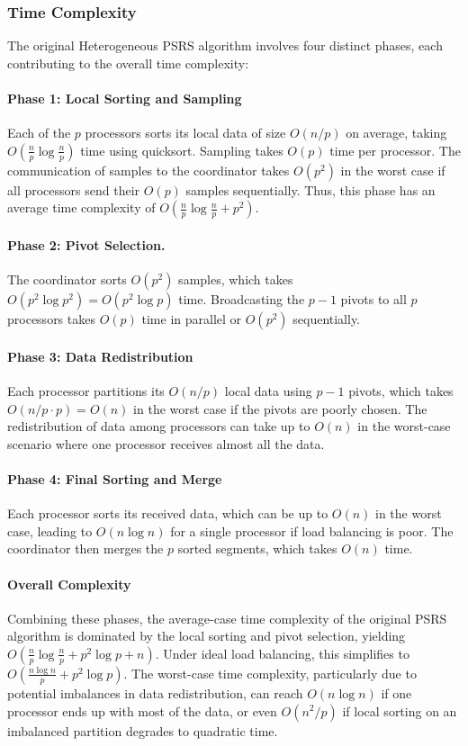 \documentclass[]{interact}
\theoremstyle{plain}
\theoremstyle{definition}
\theoremstyle{remark}
\begin{document}
\subsubsection{Time Complexity}
The original Heterogeneous PSRS algorithm involves four distinct phases, each contributing to the overall time complexity:

\paragraph{Phase 1: Local Sorting and Sampling} 
Each of the $p$ processors sorts its local data of size $O(n/p)$ on average, taking $O\left(\frac{n}{p} \log \frac{n}{p}\right)$ time using quicksort. Sampling takes $O(p)$ time per processor. The communication of samples to the coordinator takes $O(p^2)$ in the worst case if all processors send their $O(p)$ samples sequentially. Thus, this phase has an average time complexity of $O\left(\frac{n}{p} \log \frac{n}{p} + p^2\right)$.

\paragraph{Phase 2: Pivot Selection. }
The coordinator sorts $O(p^2)$ samples, which takes $O(p^2 \log p^2) = O(p^2 \log p)$ time. Broadcasting the $p - 1$ pivots to all $p$ processors takes $O(p)$ time in parallel or $O(p^2)$ sequentially.

\paragraph{Phase 3: Data Redistribution} Each processor partitions its $O(n/p)$ local data using $p - 1$ pivots, which takes $O(n/p \cdot p) = O(n)$ in the worst case if the pivots are poorly chosen. The redistribution of data among processors can take up to $O(n)$ in the worst-case scenario where one processor receives almost all the data.

\paragraph{Phase 4: Final Sorting and Merge} Each processor sorts its received data, which can be up to $O(n)$ in the worst case, leading to $O(n \log n)$ for a single processor if load balancing is poor. The coordinator then merges the $p$ sorted segments, which takes $O(n)$ time.

\paragraph{Overall Complexity} Combining these phases, the average-case time complexity of the original PSRS algorithm is dominated by the local sorting and pivot selection, yielding $O\left(\frac{n}{p} \log \frac{n}{p} + p^2 \log p + n\right)$. Under ideal load balancing, this simplifies to $O\left(\frac{n \log n}{p} + p^2 \log p\right)$. The worst-case time complexity, particularly due to potential imbalances in data redistribution, can reach $O(n \log n)$ if one processor ends up with most of the data, or even $O(n^2/p)$ if local sorting on an imbalanced partition degrades to quadratic time.
\end{document}
